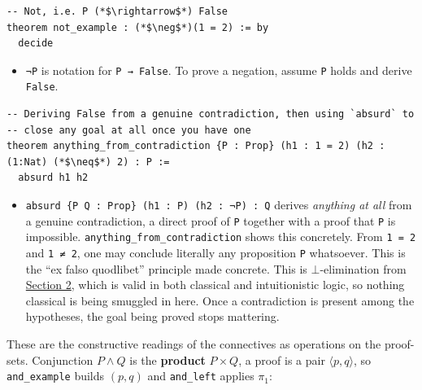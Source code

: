 \begin{lstlisting}
-- Not, i.e. P (*$\rightarrow$*) False
theorem not_example : (*$\neg$*)(1 = 2) := by
  decide
\end{lstlisting}

\begin{itemize}
\tightlist
\item
  \texttt{¬P} is notation for \texttt{P → False}. To prove a negation, assume \texttt{P} holds and derive \texttt{False}.
\end{itemize}

\begin{lstlisting}
-- Deriving False from a genuine contradiction, then using `absurd` to
-- close any goal at all once you have one
theorem anything_from_contradiction {P : Prop} (h1 : 1 = 2) (h2 : (1:Nat) (*$\neq$*) 2) : P :=
  absurd h1 h2
\end{lstlisting}

\begin{itemize}
\tightlist
\item
  \texttt{absurd \{P Q : Prop\} (h1 : P) (h2 : ¬P) : Q} derives \emph{anything at all} from a genuine contradiction, a direct proof of \texttt{P} together with a proof that \texttt{P} is impossible. \texttt{anything\_\allowbreak{}from\_\allowbreak{}contradiction} shows this concretely. From \texttt{1 = 2} and \texttt{1 ≠ 2}, one may conclude literally any proposition \texttt{P} whatsoever. This is the ``ex falso quodlibet'' principle made concrete. This is \(\bot\)-elimination from \hyperref[sec:04-propositions-and-proofs:02-logic-recap:1]{Section 2}, which is valid in both classical and intuitionistic logic, so nothing classical is being smuggled in here. Once a contradiction is present among the hypotheses, the goal being proved stops mattering.
\end{itemize}

\begin{mathreading}

These are the constructive readings of the connectives as operations on the proof-sets. Conjunction \(P \wedge Q\) is the \textbf{product} \(P \times Q\), a proof is a pair \(\langle p, q\rangle\), so \texttt{and\_\allowbreak{}example} builds \((p,q)\) and \texttt{and\_\allowbreak{}left} applies \(\pi_1\):

\end{mathreading}

\begin{center}

\end{center}


